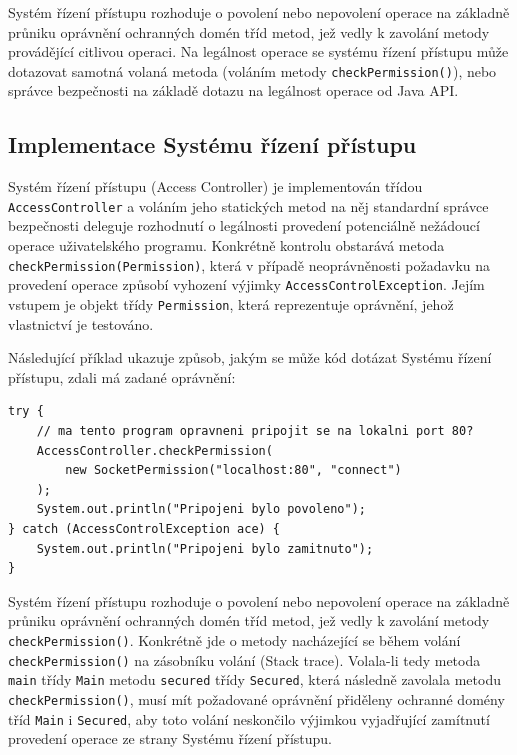 Systém řízení přístupu rozhoduje o povolení nebo nepovolení operace na základně průniku oprávnění ochranných domén tříd metod, jež vedly k zavolání metody provádějící citlivou operaci. Na legálnost operace se systému řízení přístupu může dotazovat samotná volaná metoda (voláním metody {\tt checkPermission()}), nebo správce bezpečnosti na základě dotazu na legálnost operace od Java API.

\subsection{Implementace Systému řízení přístupu}\label{implementaceAC}

Systém řízení přístupu (Access Controller) je implementován třídou {\tt AccessController} a voláním jeho statických metod na něj standardní správce bezpečnosti deleguje rozhodnutí o legálnosti provedení potenciálně nežádoucí operace uživatelského programu. Konkrétně kontrolu obstarává metoda {\tt checkPermission(Permission)}, která v případě neoprávněnosti požadavku na provedení operace způsobí vyhození výjimky {\tt AccessControlException}. Jejím vstupem je objekt třídy {\tt Permission}, která reprezentuje oprávnění, jehož vlastnictví je testováno. \cite[5.5]{oaks}\cite[6]{oaks}

Následující příklad ukazuje způsob, jakým se může kód dotázat Systému řízení přístupu, zdali má zadané oprávnění: \cite[5.5]{oaks}

\begin{lstlisting}[caption=Příklad použití Systému řízení přístupu, label=pouzitiAC]
try {
    // ma tento program opravneni pripojit se na lokalni port 80?
    AccessController.checkPermission(
        new SocketPermission("localhost:80", "connect")
    );
    System.out.println("Pripojeni bylo povoleno");
} catch (AccessControlException ace) {
    System.out.println("Pripojeni bylo zamitnuto");
}
\end{lstlisting}

Systém řízení přístupu rozhoduje o povolení nebo nepovolení operace na základně průniku oprávnění ochranných domén tříd metod, jež vedly k zavolání metody {\tt checkPermission()}. Konkrétně jde o metody nacházející se během volání {\tt checkPermission()} na zásobníku volání (Stack trace). Volala-li tedy metoda {\tt main} třídy {\tt Main} metodu {\tt secured} třídy {\tt Secured}, která následně zavolala metodu {\tt checkPermission()}, musí mít požadované oprávnění přiděleny ochranné domény tříd {\tt Main} i {\tt Secured}, aby toto volání neskončilo výjimkou vyjadřující zamítnutí provedení operace ze strany Systému řízení přístupu. \cite[5.5]{oaks}\cite[6.1]{oaks}

